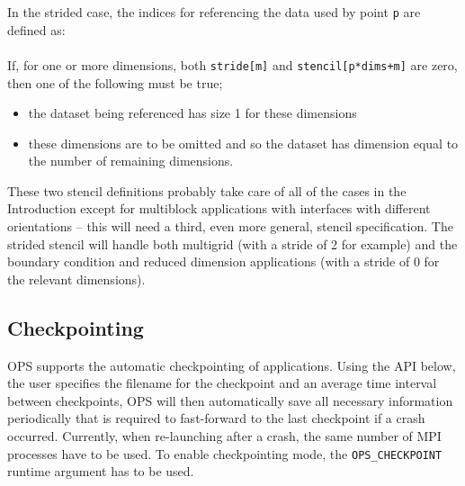 \documentclass[11pt]{article}
\begin{document}
\vspace{0.2in}

\noindent In the strided case, the indices for referencing the data used by point {\tt p} are defined as:\\

\\

\noindent If, for one or more dimensions, both {\tt stride[m]} and {\tt stencil[p*dims+m]} are zero, then one of the
following must be true;
\begin{itemize}
\item
the dataset being referenced has size 1 for these dimensions
\item
these dimensions are to be omitted and so the dataset has 
dimension equal to the number of remaining dimensions.
\end{itemize}

\noindent These two stencil definitions probably take care of all of the cases in the Introduction except for 
multiblock applications with interfaces with different orientations -- this will need a third, even more general, 
stencil specification. \noindent The strided stencil will handle both multigrid (with a stride of 2 for example) and 
the boundary condition and reduced dimension applications (with a stride of 0 for the relevant dimensions).

\subsection{Checkpointing}
OPS supports the automatic checkpointing of applications. Using the API below, the user specifies the filename for the 
checkpoint and an average time interval between checkpoints, OPS will then automatically save all necessary information 
periodically that is required to fast-forward to the last checkpoint if a crash occurred. Currently, when re-launching 
after a crash, the same number of MPI processes have to be used. To enable checkpointing mode, the {\tt OPS\_CHECKPOINT} 
runtime argument has to be used.\\
\end{document}
